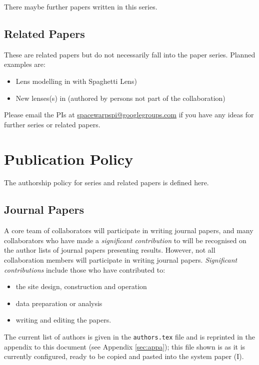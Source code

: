 \documentclass[a4paper]{article}
\begin{document}
There maybe further papers written in this series. \newline

\subsection{\sw Related Papers}
These are \sw related papers but do not necessarily fall into the \sw paper series. Planned examples are:
\begin{itemize}
\item Lens modelling in \sw with {\sc Spaghetti Lens})
\item New lenses(s) in \sw (authored by persons not part of the \sw collaboration)
\end{itemize}


Please email the \sw PIs at \href{mailto:spacewarpspi@googlegroups.com}{spacewarpspi@googlegroups.com} if you have any
ideas for further \sw series or related papers. 
 

\section{Publication Policy}
\label{sec:publ}


The authorship policy for \sw series and related papers is defined here.


\subsection{Journal Papers}
\label{sec:series}

A core team of collaborators will participate in writing journal papers, and
many collaborators who have made a \textit{significant contribution} to \sw
will be recognised on the author lists of journal papers presenting \sw
results.  However, not all collaboration members will participate in writing
journal papers.  \textit{Significant contributions} include those who have
contributed to:
\begin{itemize}
\item the site design, construction and operation
\item data preparation or analysis
\item writing and editing the papers. 
\end{itemize}


The current list of \sw authors is given in the \texttt{authors.tex} file and is reprinted
in the appendix to this document (see Appendix \ref{sec:appa}); this file shown is as it is currently configured, ready to be copied and pasted into the \sw system paper (\sw I). 
\end{document}
